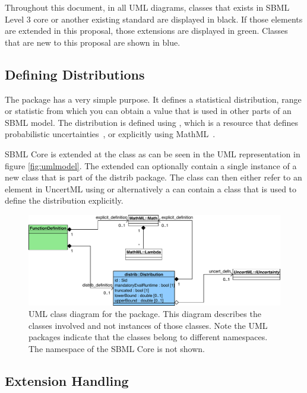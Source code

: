 \documentclass[draftspec]{sbmlpkgspec}
\begin{document}
Throughout this document, in all UML diagrams, classes that exists in
SBML Level 3 core or another existing standard are displayed in
black. If those elements are extended in this proposal, those
extensions are displayed in green. Classes that are new to this
proposal are shown in blue.

\subsection{Defining Distributions}

The \distrib package has a very simple purpose. It defines a
statistical distribution, range or statistic from which you can obtain
a value that is used in other parts of an SBML model. The distribution
is defined using \uncertml, which is a resource that defines
probabilistic uncertainties~\cite{uncertml}, or explicitly using
MathML~\cite{mathml2}.

SBML Core is extended at the \FunctionDefinition class as can be seen
in the UML representation in figure \vref{fig:umlmodel}. The extended
\FunctionDefinition can optionally contain a single instance of a new
class  that is part of the distrib package. The  class can
then either refer to an element in UncertML using or alternatively a
 can contain a \mmath class that is used to define the
distribution explicitly.

\begin{figure}[htb]
\includegraphics[width=1.0\linewidth]{DistribUMLModel.pdf}
\caption{UML class diagram for the \distrib package. This diagram describes the
  classes involved and not instances of those classes. Note the UML packages
  indicate that the classes belong to different namespaces. The
  namespace of the SBML Core is not shown.}
\label{fig:umlmodel}
\end{figure}

\subsection{Extension Handling}
\end{document}
